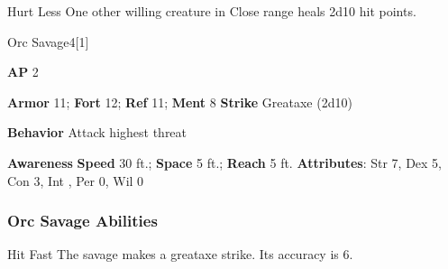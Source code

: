 \vspace{0.5em}
\begin{ability}{Hurt Less}
One other willing creature in Close range heals 2d10 hit points.
\end{ability}

\begin{monsection}{Orc Savage}{4}[1]
\vspace{-1em}\vspace{-1em}
\begin{spellcontent}
\begin{spelltargetinginfo}
{\textbf{AP} 2}

\pari \textbf{Armor} 11;
\textbf{Fort} 12;
\textbf{Ref} 11;
\textbf{Ment} 8
\pari \textbf{Strike} Greataxe  (2d10)



\pari \textbf{Behavior} Attack highest threat
\end{spelltargetinginfo}
\end{spellcontent}

\begin{monsterfooter}
\pari \textbf{Awareness} 
\pari \textbf{Speed} 30 ft.;
\textbf{Space} 5 ft.;
\textbf{Reach} 5 ft.
\pari \textbf{Attributes}:
Str 7,
Dex 5,
Con 3,
Int ,
Per 0,
Wil 0
\end{monsterfooter}
\end{monsection}


\subsubsection{Orc Savage Abilities}

\begin{ability}{Hit Fast}
The savage makes a greataxe strike.
Its accuracy is 6.
\end{ability}

